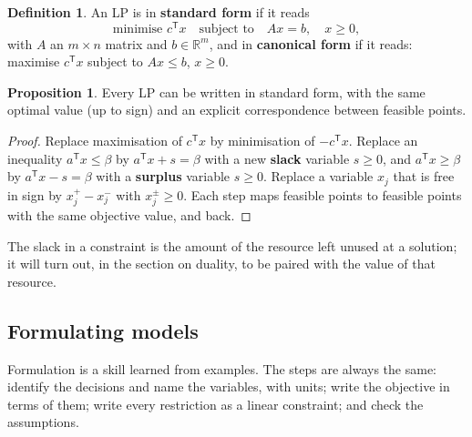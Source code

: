 \documentclass[11pt,a4paper]{article}
\numberwithin{equation}{section}
\theoremstyle{definition}
\newtheorem{defn}[thm]{Definition}
\newtheorem{prop}[thm]{Proposition}
\begin{document}
\begin{defn}
An LP is in \textbf{standard form} if it reads
\[
\text{minimise } c^{\mathsf T}x \quad\text{subject to}\quad Ax = b, \quad x \geq 0 ,
\]
with $A$ an $m \times n$ matrix and $b \in \mathbb R^m$, and in \textbf{canonical form} if it reads: maximise $c^{\mathsf T}x$ subject to $Ax \leq b$, $x \geq 0$.
\end{defn}

\begin{prop}
\label{prop:standardform}
Every LP can be written in standard form, with the same optimal value (up to sign) and an explicit correspondence between feasible points.
\end{prop}

\begin{proof}
Replace maximisation of $c^{\mathsf T}x$ by minimisation of $-c^{\mathsf T}x$. Replace an inequality $a^{\mathsf T}x \leq \beta$ by $a^{\mathsf T}x + s = \beta$ with a new \textbf{slack} variable $s \geq 0$, and $a^{\mathsf T}x \geq \beta$ by $a^{\mathsf T}x - s = \beta$ with a \textbf{surplus} variable $s \geq 0$. Replace a
variable $x_j$ that is free in sign by $x_j^+ - x_j^-$ with $x_j^\pm \geq 0$. Each step maps feasible points to feasible points with the same objective value, and back.
\end{proof}

The slack in a constraint is the amount of the resource left unused at a solution; it will turn out, in the section on duality, to be paired with the value of that resource.

\subsection{Formulating models}
\label{ssec:formulating}

Formulation is a skill learned from examples. The steps are always the same: identify the decisions and name the variables, with units; write the objective in terms of them; write every restriction as a linear constraint; and check the assumptions.
\end{document}
